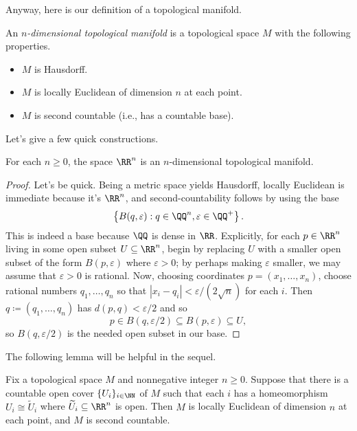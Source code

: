 \documentclass[../notes.tex]{subfiles}
\begin{document}
Anyway, here is our definition of a topological manifold.
\begin{definition}
	An \textit{$n$-dimensional topological manifold} is a topological space $M$ with the following properties.
	\begin{itemize}
		\item $M$ is Hausdorff.
		\item $M$ is locally Euclidean of dimension $n$ at each point.
		\item $M$ is second countable (i.e., has a countable base).
	\end{itemize}
\end{definition}
Let's give a few quick constructions.
\begin{lemma} \label{lem:rn-manifold}
	For each $n\ge0$, the space $\RR^n$ is an $n$-dimensional topological manifold.
\end{lemma}
\begin{proof}
	Let's be quick. Being a metric space yields Hausdorff, locally Euclidean is immediate because it's $\RR^n$, and second-countability follows by using the base
	\[\left\{B(q,\varepsilon):q\in\QQ^n,\varepsilon\in\QQ^+\right\}.\]
	This is indeed a base because $\QQ$ is dense in $\RR$. Explicitly, for each $p\in\RR^n$ living in some open subset $U\subseteq\RR^n$, begin by replacing $U$ with a smaller open subset of the form $B(p,\varepsilon)$ where $\varepsilon>0$; by perhaps making $\varepsilon$ smaller, we may assume that $\varepsilon>0$ is rational. Now, choosing coordinates $p=(x_1,\ldots,x_n)$, choose rational numbers $q_1,\ldots,q_n$ so that $\left|x_i-q_i\right|<\varepsilon/(2\sqrt n)$ for each $i$. Then $q\coloneqq(q_1,\ldots,q_n)$ has $d(p,q)<\varepsilon/2$ and so
	\[p\in B(q,\varepsilon/2)\subseteq B(p,\varepsilon)\subseteq U,\]
	so $B(q,\varepsilon/2)$ is the needed open subset in our base.
\end{proof}
The following lemma will be helpful in the sequel.
\begin{lemma} \label{lem:get-second-countable}
	Fix a topological space $M$ and nonnegative integer $n\ge0$. Suppose that there is a countable open cover $\{U_i\}_{i\in\NN}$ of $M$ such that each $i$ has a homeomorphism $U_i\cong\widetilde U_i$ where $\widetilde U_i\subseteq\RR^n$ is open. Then $M$ is locally Euclidean of dimension $n$ at each point, and $M$ is second countable.
\end{lemma}
\end{document}
